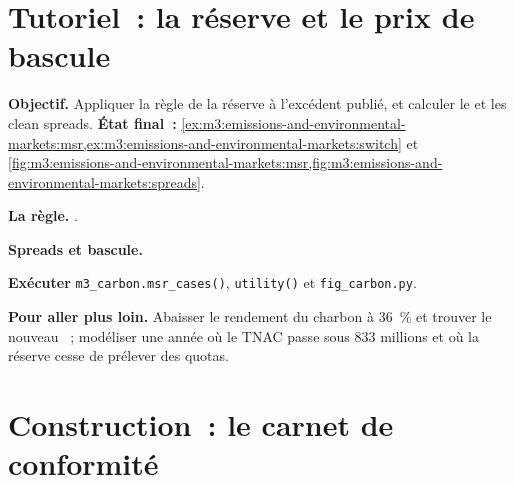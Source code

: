 \section{Tutoriel~: la réserve et le prix de bascule}\label{tut:m3:emissions-and-environmental-markets:switch}

\begin{tutorial}
\textbf{Objectif.} Appliquer la règle de la réserve à l'excédent publié, et calculer le 
et les clean spreads. \textbf{État final~:}
\cref{ex:m3:emissions-and-environmental-markets:msr,ex:m3:emissions-and-environmental-markets:switch}
et \cref{fig:m3:emissions-and-environmental-markets:msr,fig:m3:emissions-and-environmental-markets:spreads}.
\begin{tutsteps}
\item \textbf{La règle.} .
\label{lst:m3:emissions-and-environmental-markets:msr}
\item \textbf{Spreads et bascule.}
\label{lst:m3:emissions-and-environmental-markets:switch}
\item \textbf{Exécuter} \texttt{m3\_carbon.msr\_cases()}, \texttt{utility()} et \texttt{fig\_carbon.py}.
\end{tutsteps}
\textbf{Pour aller plus loin.} Abaisser le rendement du charbon à 36~\% et trouver le nouveau ~; modéliser
une année où le TNAC passe sous 833 millions et où la réserve cesse de prélever des quotas.
\end{tutorial}

\section{Construction~: le carnet de conformité}\label{bld:m3:emissions-and-environmental-markets:carbon}


